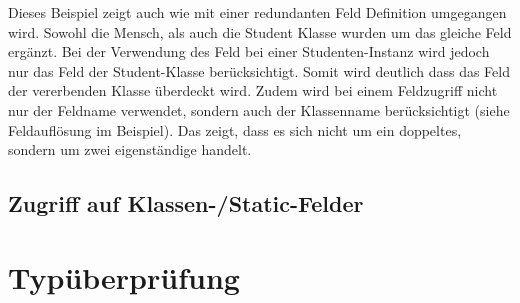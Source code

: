 \documentclass[conference]{IEEEtran}
\begin{document}
Dieses Beispiel zeigt auch wie mit einer redundanten Feld Definition umgegangen wird. Sowohl die Mensch, als auch die Student Klasse wurden um das gleiche Feld ergänzt. Bei der Verwendung des Feld bei einer Studenten-Instanz wird jedoch nur das Feld der Student-Klasse berücksichtigt. Somit wird deutlich dass das Feld der vererbenden Klasse überdeckt wird. Zudem wird bei einem Feldzugriff nicht nur der Feldname verwendet, sondern auch der Klassenname berücksichtigt (siehe Feldauflösung im Beispiel). Das zeigt, dass es sich nicht um ein doppeltes, sondern um zwei eigenständige handelt. \cite{Venners.1996}


\subsection{Zugriff auf Klassen-/Static-Felder}

\section{Typüberprüfung}


 
\end{document}

